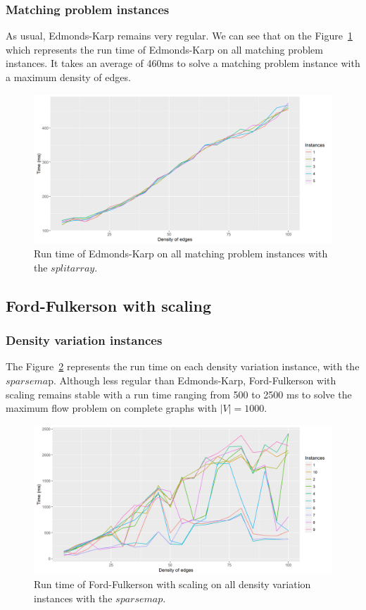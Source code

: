 \subsubsection{Matching problem instances}
As usual, Edmonds-Karp remains very regular. We can see that on the Figure~\ref{fig:ekmatching} which represents the run time of Edmonds-Karp on all matching problem instances. It takes an average of 460ms to solve a matching problem instance with a maximum density of edges.
\begin{figure}[H]
\begin{center}
\includegraphics[scale=0.5]{images/results/ekmatching.png}
\caption{Run time of Edmonds-Karp on all matching problem instances with the $split array$.}
\label{fig:ekmatching}
\end{center}
\end{figure}


\subsection{Ford-Fulkerson with scaling}
\subsubsection{Density variation instances}
The Figure~\ref{fig:FFmean} represents the run time on each density variation instance, with the $sparsema$p. Although less regular than Edmonds-Karp, Ford-Fulkerson with scaling remains stable with a run time ranging from 500 to 2500 ms to solve the maximum flow problem on complete graphs with $|V|=1000$.
\begin{figure}[H]
\begin{center}
\includegraphics[scale=0.5]{images/results/FFmean.png}
\caption{Run time of Ford-Fulkerson with scaling on all density variation instances with the $sparse map$.}
\label{fig:FFmean}
\end{center}
\end{figure}

